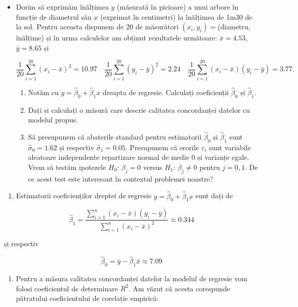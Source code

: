 \documentclass[]{article}
\providecommand{\tightlist}{%
  \setlength{\itemsep}{0pt}\setlength{\parskip}{0pt}}
\newenvironment{frshaded*}{%
  \def\FrameCommand{\fboxrule=\FrameRule\fboxsep=\FrameSep \fcolorbox{framecolor}{shadecolor1}}%
  \MakeFramed {\advance\hsize-\width \FrameRestore}}%
{\endMakeFramed}
\newenvironment{rmdblock}[1]
  {\begin{frshaded*}
  \begin{itemize}
  \renewcommand{\labelitemi}{
    \raisebox{-.7\height}[0pt][0pt]{
      {\setkeys{Gin}{width=2em,keepaspectratio}\texttt{[image: images/icons/\#1]}}
    }
  }
  \item
  }
  {
  \end{itemize}
  \end{frshaded*}
  }
\newenvironment{rmdexercise}
  {\begin{rmdblock}{exercise}}
  {\end{rmdblock}}
\begin{document}
\begin{rmdexercise}
Dorim să exprimăm înălțimea \(y\) (măsurată în picioare) a unui arbore
în funcție de diametrul său \(x\) (exprimat în centimetri) la înălțimea
de 1m30 de la sol. Pentru aceasta dispunem de 20 de măsurători
\((x_i,y_i)=\)(diametru, înălțime) și în urma calculelor am obținut
rezultatele următoare: \(\bar x = 4.53\), \(\bar y = 8.65\) și

\[
\frac{1}{20}\sum_{i = 1}^{20}(x_i - \bar x)^2 = 10.97 \quad \frac{1}{20}\sum_{i = 1}^{20}(y_i - \bar y)^2 = 2.24 \quad \frac{1}{20}\sum_{i = 1}^{20}(x_i - \bar x)(y_i - \bar y) = 3.77.
\]

\begin{enumerate}
\def\labelenumi{\arabic{enumi}.}
\item
  Notăm cu \(y = \hat \beta_0 + \hat \beta_1 x\) dreapta de regresie.
  Calculați coeficienții \(\hat \beta_0\) și \(\hat \beta_1\).
\item
  Dați și calculați o măsură care descrie calitatea concordanței datelor
  cu modelul propus.
\item
  Să presupunem că abaterile standard pentru estimatorii
  \(\hat \beta_0\) și \(\hat \beta_1\) sunt \(\hat \sigma_0 = 1.62\) și
  respectiv \(\hat \sigma_1 = 0.05\). Presupunem că erorile
  \(\varepsilon_i\) sunt variabile aleatoare independente repartizare
  normal de medie \(0\) și varianțe egale. Vrem să testăm ipotezele
  \(H_0:\, \beta_j = 0\) versus \(H_1:\, \beta_j \neq 0\) pentru
  \(j = 0,1\). De ce acest test este interesant în contextul problemei
  noastre?
\end{enumerate}
\end{rmdexercise}

\begin{enumerate}
\def\labelenumi{\arabic{enumi}.}
\tightlist
\item
  Estimatorii coeficienților dreptei de regresie
  \(y = \hat \beta_0 + \hat \beta_1 x\) sunt dați de
\end{enumerate}

\[
  \hat \beta_1 = \frac{\sum_{i = 1}^{n}(x_i - \bar x)(y_i - \bar y)}{\sum_{i = 1}^{n}(x_i - \bar x)^2} \approx 0.344
\]

și respectiv

\[
  \hat \beta_0 = \bar y - \hat \beta_1 \bar x \approx 7.09
\]

\begin{enumerate}
\def\labelenumi{\arabic{enumi}.}
\setcounter{enumi}{1}
\tightlist
\item
  Pentru a măsura calitatea concordanței datelor la modelul de regresie
  vom folosi coeficientul de determinare \(R^2\). Am văzut că acesta
  corespunde pătratului coeficientului de corelație empirică:
\end{enumerate}
\end{document}

